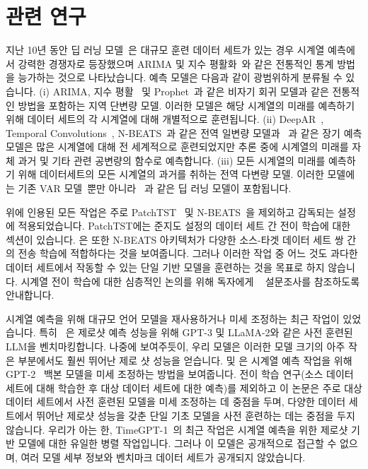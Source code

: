 \documentclass{article}
\begin{document}
\section{관련 연구}
\label{sec:related}
지난 10년 동안 딥 러닝 모델~\citep{salinas2020deepar, oreshkin2019n}은 대규모 훈련 데이터 세트가 있는 경우 시계열 예측에서 강력한 경쟁자로 등장했으며 ARIMA 및 지수 평활화~\citep{mckenzie1984general}와 같은 전통적인 통계 방법을 능가하는 것으로 나타났습니다. 예측 모델은 다음과 같이 광범위하게 분류될 수 있습니다. (i) ARIMA, 지수 평활~\citep{mckenzie1984general} 및 Prophet~\citep{taylor2018forecasting}과 같은 비자기 회귀 모델과 같은 전통적인 방법을 포함하는 지역 단변량 모델. 이러한 모델은 해당 시계열의 미래를 예측하기 위해 데이터 세트의 각 시계열에 대해 개별적으로 훈련됩니다. (ii) DeepAR~\citep{salinas2020deepar}, Temporal Convolutions~\citep{borovykh2017conditional}, N-BEATS~\citep{oreshkin2019n}과 같은 전역 일변량 모델과 ~\citep{nie2022time, das2023longterm}과 같은 장기 예측 모델은 많은 시계열에 대해 전 세계적으로 훈련되었지만 추론 중에 시계열의 미래를 자체 과거 및 기타 관련 공변량의 함수로 예측합니다. (iii) 모든 시계열의 미래를 예측하기 위해 데이터세트의 모든 시계열의 과거를 취하는 전역 다변량 모델. 이러한 모델에는 기존 VAR 모델~\citep{zivot2006vector}뿐만 아니라 ~\citep{sen2019think, zhou2022fedformer, chen2023tsmixer}과 같은 딥 러닝 모델이 포함됩니다.

위에 인용된 모든 작업은 주로 PatchTST~\citep{nie2022time} 및 N-BEATS~\citep{oreshkin2019n}을 제외하고 감독되는 설정에 적용되었습니다. PatchTST에는 준지도 설정의 데이터 세트 간 전이 학습에 대한 섹션이 있습니다.
\citep{oreshkin2021meta}은 또한 N-BEATS 아키텍처가 다양한 소스-타겟 데이터 세트 쌍 간의 전송 학습에 적합하다는 것을 보여줍니다. 그러나 이러한 작업 중 어느 것도 과다한 데이터 세트에서 작동할 수 있는 단일 기반 모델을 훈련하는 것을 목표로 하지 않습니다. 시계열 전이 학습에 대한 심층적인 논의를 위해 독자에게 ~\citep{ma2023survey} 설문조사를 참조하도록 안내합니다.

시계열 예측을 위해 대규모 언어 모델을 재사용하거나 미세 조정하는 최근 작업이 있었습니다. 특히 ~\citep{gruver2023large}은 제로샷 예측 성능을 위해 GPT-3 및 LLaMA-2와 같은 사전 훈련된 LLM을 벤치마킹합니다. 나중에 보여주듯이, 우리 모델은 이러한 모델 크기의 아주 작은 부분에서도 훨씬 뛰어난 제로 샷 성능을 얻습니다.
\citep{zhou2023one} 및 \citep{chang2023llm4ts}은 시계열 예측 작업을 위해 GPT-2~\citep{radford2019language} 백본 모델을 미세 조정하는 방법을 보여줍니다.
전이 학습 연구(소스 데이터 세트에 대해 학습한 후 대상 데이터 세트에 대한 예측)를 제외하고 이 논문은
주로 대상 데이터 세트에서 사전 훈련된 모델을 미세 조정하는 데 중점을 두며, 다양한 데이터 세트에서 뛰어난 제로샷 성능을 갖춘 단일 기초 모델을 사전 훈련하는 데는 중점을 두지 않습니다. 우리가 아는 한, TimeGPT-1~\citep{garza2023timegpt}의 최근 작업은 시계열 예측을 위한 제로샷 기반 모델에 대한 유일한 병렬 작업입니다. 그러나 이 모델은 공개적으로 접근할 수 없으며, 여러 모델 세부 정보와 벤치마크 데이터 세트가 공개되지 않았습니다.
\end{document}
